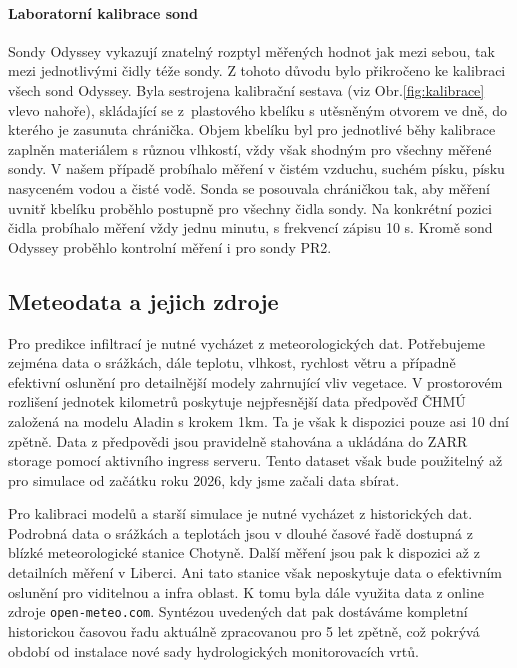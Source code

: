 \documentclass[11pt,a4paper]{article}
\begin{document}
\begin{onehalfspacing}
\paragraph{Laboratorní kalibrace sond}
Sondy Odyssey vykazují znatelný rozptyl měřených hodnot jak mezi sebou, tak mezi jednotlivými čidly téže sondy. Z tohoto důvodu bylo přikročeno ke kalibraci všech sond Odyssey. Byla sestrojena kalibrační sestava (viz Obr.\ref{fig:kalibrace} vlevo nahoře), skládající se z~plastového kbelíku s utěsněným otvorem ve dně, do kterého je zasunuta chránička. Objem kbelíku byl pro jednotlivé běhy kalibrace zaplněn materiálem s různou vlhkostí, vždy však shodným pro všechny měřené sondy. V našem případě probíhalo měření v čistém vzduchu, suchém písku, písku nasyceném vodou a čisté vodě. Sonda se posouvala chráničkou tak, aby měření uvnitř kbelíku proběhlo postupně pro všechny čidla sondy. Na konkrétní pozici čidla probíhalo měření vždy jednu minutu, s frekvencí zápisu 10 s. Kromě sond Odyssey proběhlo kontrolní měření i pro sondy PR2.




\subsection{Meteodata a jejich zdroje}

Pro predikce infiltrací je nutné vycházet z meteorologických dat. Potřebujeme zejména 
data o srážkách, dále teplotu, vlhkost, rychlost větru a případně efektivní oslunění pro detailnější modely zahrnující vliv vegetace. V prostorovém rozlišení jednotek kilometrů 
poskytuje nejpřesnější data předpověď ČHMÚ založená na modelu Aladin s krokem 1km. Ta je však 
k dispozici pouze asi 10 dní zpětně. Data z předpovědi jsou pravidelně stahována a ukládána do ZARR storage pomocí aktivního ingress serveru. Tento dataset však bude použitelný až pro simulace od začátku roku 2026, kdy jsme začali data sbírat.

Pro kalibraci modelů a starší simulace je nutné vycházet z historických dat. Podrobná data o srážkách a teplotách jsou v dlouhé časové řadě dostupná z blízké meteorologické stanice Chotyně. Další měření jsou pak k dispozici až z detailních měření v Liberci. Ani tato stanice však neposkytuje data o efektivním oslunění pro viditelnou a infra oblast. K tomu byla dále využita 
data z online zdroje \verb'open-meteo.com'. Syntézou uvedených dat pak dostáváme kompletní historickou časovou řadu aktuálně zpracovanou pro 5 let zpětně, což pokrývá období od instalace nové sady hydrologických monitorovacích vrtů.


\end{onehalfspacing}
\end{document}
